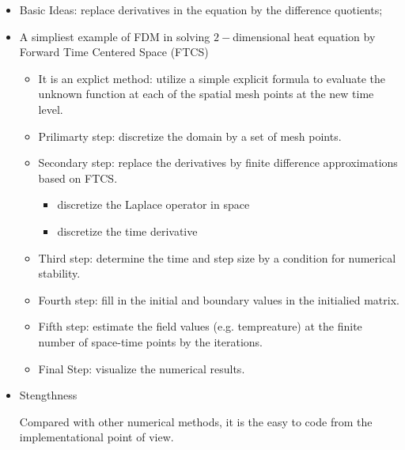       \begin{itemize}
        \item Basic Ideas: replace derivatives in the equation by the difference quotients; 
        \item A simpliest example of FDM in solving $2-$dimensional heat equation by Forward Time Centered Space (FTCS) \cite{pletcher2012computational}
          \begin{itemize}
            \item It is an explict method: utilize a simple explicit formula to evaluate the unknown function at each of the spatial mesh points at the new time level.
            \item Prilimarty step: discretize the domain by a set of mesh points.
            \item Secondary step: replace the derivatives by finite difference approximations based on FTCS.
              \begin{itemize}
                \item discretize the Laplace operator in space
                \item discretize the time derivative
              \end{itemize}
              
            \item Third step: determine the time and step size by a condition for numerical stability.
            \item Fourth step: fill in the initial and boundary values in the initialied matrix.
            \item Fifth step: estimate the field values (e.g. tempreature) at the finite number of space-time points by the iterations.
            \item Final Step: visualize the numerical results.
          \end{itemize}
      
        \item Stengthness
          
          \par Compared with other numerical methods, it is the easy to code from the implementational point of view.
          

\end{itemize}
